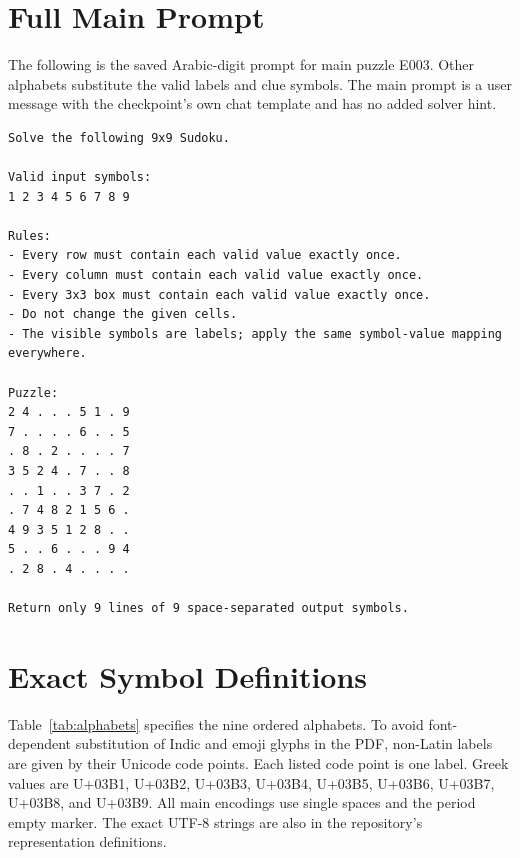 \documentclass[11pt]{article}
\begin{document}
\section{Full Main Prompt}\label{app:prompt}
The following is the saved Arabic-digit prompt for main puzzle E003. Other alphabets substitute the valid labels and clue symbols. The main prompt is a user message with the checkpoint's own chat template and has no added solver hint.
\begin{Verbatim}[fontsize=\footnotesize,breaklines=true,breakanywhere=true]
Solve the following 9x9 Sudoku.

Valid input symbols:
1 2 3 4 5 6 7 8 9

Rules:
- Every row must contain each valid value exactly once.
- Every column must contain each valid value exactly once.
- Every 3x3 box must contain each valid value exactly once.
- Do not change the given cells.
- The visible symbols are labels; apply the same symbol-value mapping everywhere.

Puzzle:
2 4 . . . 5 1 . 9
7 . . . . 6 . . 5
. 8 . 2 . . . . 7
3 5 2 4 . 7 . . 8
. . 1 . . 3 7 . 2
. 7 4 8 2 1 5 6 .
4 9 3 5 1 2 8 . .
5 . . 6 . . . 9 4
. 2 8 . 4 . . . .

Return only 9 lines of 9 space-separated output symbols.
\end{Verbatim}

\section{Exact Symbol Definitions}\label{app:alphabets}
Table~\ref{tab:alphabets} specifies the nine ordered alphabets. To avoid font-dependent substitution of Indic and emoji glyphs in the PDF, non-Latin labels are given by their Unicode code points. Each listed code point is one label. Greek values are U+03B1, U+03B2, U+03B3, U+03B4, U+03B5, U+03B6, U+03B7, U+03B8, and U+03B9. All main encodings use single spaces and the period empty marker. The exact UTF-8 strings are also in the repository's representation definitions.
\end{document}
